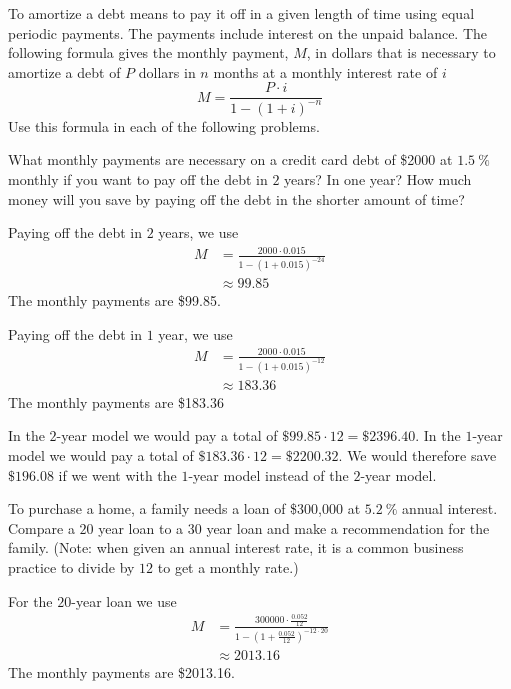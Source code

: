 \begin{problem}
To amortize a debt means to pay it off in a given length of time using 
equal periodic payments. The payments include interest on the unpaid 
balance. The following formula gives the monthly payment, $M$, in dollars
that is necessary to amortize a debt of $P$ dollars in $n$ months 
at a monthly interest rate of $i$
\[
	M=\frac{P\cdot i}{1-(1+i)^{-n}}
\]
Use this formula in each of the following problems.
\begin{subproblem}
	What monthly payments are necessary on a credit card debt of \$2000 at 
	$\SI{1.5}{\percent}$ monthly if you want to pay off the debt in $2$ years?
	In one year? How much money will you save by paying off the debt in the
	shorter amount of time?
	\begin{shortsolution}
		Paying off the debt in $2$ years, we use
		\begin{align*}
			M & = \frac{2000\cdot 0.015}{1-(1+0.015)^{-24}} \\ 
			  & \approx 99.85                               
		\end{align*}
		The monthly payments are \$99.85.
				
		Paying off the debt in $1$ year, we use
		\begin{align*}
			M & = \frac{2000\cdot 0.015}{1-(1+0.015)^{-12}} \\ 
			  & \approx 183.36                              
		\end{align*}
		The monthly payments are \$183.36
				
		In the $2$-year model we would pay a total of $\$99.85\cdot 12=\$2396.40$. In the
		$1$-year model we would pay a total of $\$183.36\cdot 12=\$2200.32$. We would therefore
		save $\$196.08$ if we went with the $1$-year model instead of the $2$-year model.
	\end{shortsolution}
\end{subproblem}
\begin{subproblem}
	To purchase a home, a family needs a loan of \$300,000 at $\SI{5.2}{\percent}$ 
	annual interest.  Compare a $20$ year loan to a $30$ year loan and make 
	a recommendation for the family.
	(Note: when given an annual interest rate, it is a common business practice to divide by
	$12$ to get a monthly rate.)
	\begin{shortsolution}
		For the $20$-year loan we use
		\begin{align*}
			M & = \frac{300000\cdot \frac{0.052}{12}}{1-\left( 1+\frac{0.052}{12} \right)^{-12\cdot 20}} \\ 
			  & \approx 2013.16                                                                          
		\end{align*}
		The monthly payments are \$2013.16.
				

\end{shortsolution}
\end{subproblem}
\end{problem}
